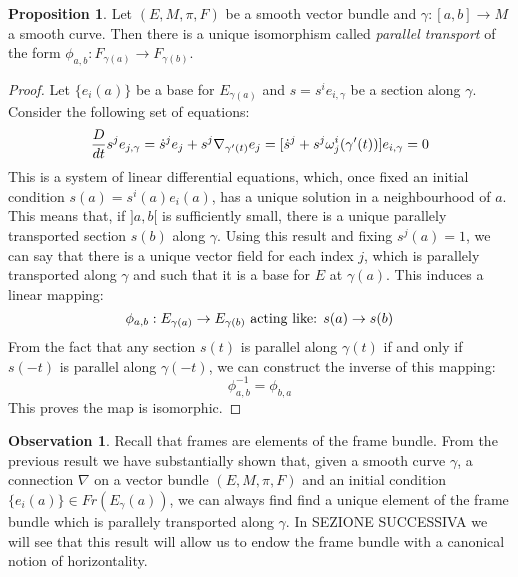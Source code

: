 \documentclass[12pt,a4paper]{report}
\theoremstyle{definition}
\theoremstyle{Theorem}
\newtheorem{Prop}[Def]{Proposition}
\theoremstyle{definition}
\theoremstyle{definition}
\newtheorem{Obs}[Def]{Observation}
\begin{document}
	\begin{Prop}
		Let $(E,M,\pi,F)$ be a smooth vector bundle and $\gamma:[a,b]\rightarrow M$ a smooth curve. Then there is a unique isomorphism called \textit{parallel transport} of the form $\phi_{a,b}:F_{\gamma(a)}\rightarrow F_{\gamma(b)}$.
	\end{Prop}
	\begin{proof}
		Let $\{e_i(a)\}$ be a base for $E_{\gamma(a)}$ and $s=s^ie_{i,\gamma}$ be a section along $\gamma$. Consider the following set of equations:
		$${D\over dt}{s^je_{j,\gamma}}=\dot{s}^je_j+s^j\nabla_{\gamma'(t)}e_j=[\dot{s}^j+s^j\omega^i_j(\gamma'(t))]e_{i,\gamma}=0$$
		This is a system of linear differential equations, which, once fixed an initial condition $s(a)=s^i(a)e_i(a)$, has a unique solution in a neighbourhood of $a$.  This means that, if $]a,b[$ is sufficiently small, there is a unique parallely transported section $s(b)$ along $\gamma$. Using this result and fixing $s^j(a)=1$, we can say that there is a unique vector field for each index $j$, which is parallely transported along $\gamma$ and such that it is a base for $E$ at $\gamma(a)$. This induces a linear mapping:
		$$\phi_{a,b}:E_{\gamma(a)}\rightarrow E_{\gamma(b)}\hbox{ acting like: } s(a)\rightarrow s(b)$$
		From the fact that any section $s(t)$ is parallel along $\gamma(t)$ if and only if $s(-t)$ is parallel along $\gamma(-t)$, we can construct the inverse of this mapping:
		$$\phi^{-1}_{a,b}=\phi_{b,a}$$
		This proves the map is isomorphic.
	\end{proof}
	\begin{Obs}
		Recall that frames are elements of the frame bundle. From the previous result we have substantially shown that, given a smooth curve $\gamma$, a connection $\nabla$ on a vector bundle $(E,M,\pi,F)$ and an initial condition $\{e_i(a)\}\in Fr(E_\gamma(a))$, we can always find find a unique element of the frame bundle which is parallely transported along $\gamma$. In SEZIONE SUCCESSIVA we will see that this result will allow us to endow the frame bundle with a canonical notion of horizontality.
	\end{Obs}
	\begin{comment}
	We now look at the notion of parallel transport on the tangent bundle of a manifold.
	\section{The parallel transport on the tangent bundle}
	In this section we will use the previous results to study the notion of parallel transport on the tangent bundle of a smooth manifold. More information on this topic can be found in [2] chap.3 pag. 95-102.
	\end{comment}
\end{document}
